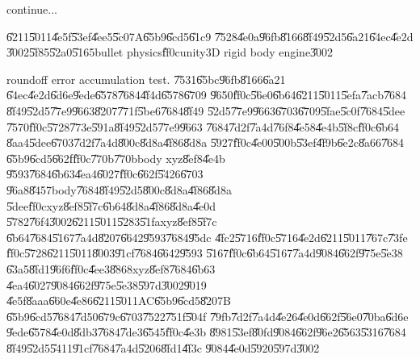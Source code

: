 continue...

\clearpage%

\begin{case}
\U{6211}\U{5011}\U{4e5f}\U{53ef}\U{4ee5}\U{5c07}A\U{65b9}\U{6cd5}\U{61c9}%
\U{7528}\U{4e0a}\U{96fb}\U{8166}\U{8f49}\U{52d5}\U{6a21}\U{64ec}\U{4e2d}%
\U{3002}\U{5f85}\U{52a0}\U{5165}bullet physics\U{ff0c}unity3D rigid body
engine\U{3002}
\end{case}

\clearpage%

\begin{case}
roundoff error accumulation test. \U{7531}\U{65bc}\U{96fb}\U{8166}\U{6a21}%
\U{64ec}\U{4e2d}\U{6d6e}\U{9ede}\U{6578}\U{7684}\U{4f4d}\U{6578}\U{6709}%
\U{9650}\U{ff0c}\U{56e0}\U{6b64}\U{6211}\U{5011}\U{5efa}\U{7acb}\U{7684}%
\U{8f49}\U{52d5}\U{77e9}\U{9663}\U{8207}\U{771f}\U{5be6}\U{7684}\U{8f49}%
\U{52d5}\U{77e9}\U{9663}\U{6703}\U{6709}\U{5fae}\U{5c0f}\U{7684}\U{5dee}%
\U{7570}\U{ff0c}\U{5728}\U{773e}\U{591a}\U{8f49}\U{52d5}\U{77e9}\U{9663}%
\U{7684}\U{7d2f}\U{7a4d}\U{76f8}\U{4e58}\U{4e4b}\U{5f8c}\U{ff0c}\U{6b64}%
\U{8aa4}\U{5dee}\U{6703}\U{7d2f}\U{7a4d}\U{800c}\U{8d8a}\U{4f86}\U{8d8a}%
\U{5927}\U{ff0c}\U{4e00}\U{500b}\U{53ef}\U{4f9b}\U{6e2c}\U{8a66}\U{7684}%
\U{65b9}\U{6cd5}\U{662f}\U{ff0c}\U{770b}\U{770b}body xyz\U{8ef8}\U{4e4b}%
\U{9593}\U{7684}\U{6b63}\U{4ea4}\U{6027}\U{ff0c}\U{662f}\U{5426}\U{6703}%
\U{96a8}\U{8457}body\U{7684}\U{8f49}\U{52d5}\U{800c}\U{8d8a}\U{4f86}\U{8d8a}%
\U{5dee}\U{ff0c}xyz\U{8ef8}\U{5f7c}\U{6b64}\U{8d8a}\U{4f86}\U{8d8a}\U{4e0d}%
\U{5782}\U{76f4}\U{3002}\U{6211}\U{5011}\U{5283}\U{51fa}xyz\U{8ef8}\U{5f7c}%
\U{6b64}\U{7684}\U{5167}\U{7a4d}\U{8207}\U{6642}\U{9593}\U{7684}\U{95dc}%
\U{4fc2}\U{5716}\U{ff0c}\U{5716}\U{4e2d}\U{6211}\U{5011}\U{767c}\U{73fe}%
\U{ff0c}\U{5728}\U{6211}\U{5011}\U{8003}\U{91cf}\U{7684}\U{6642}\U{9593}%
\U{5167}\U{ff0c}\U{6b64}\U{5167}\U{7a4d}\U{9084}\U{662f}\U{975e}\U{5e38}%
\U{63a5}\U{8fd1}\U{96f6}\U{ff0c}\U{4ee3}\U{8868}xyz\U{8ef8}\U{7684}\U{6b63}%
\U{4ea4}\U{6027}\U{9084}\U{662f}\U{975e}\U{5e38}\U{597d}\U{3002}\U{9019}%
\U{4e5f}\U{8aaa}\U{660e}\U{4e86}\U{6211}\U{5011}AC\U{65b9}\U{6cd5}\U{8207}B%
\U{65b9}\U{6cd5}\U{7684}\U{7d50}\U{679c}\U{6703}\U{7522}\U{751f}\U{504f}%
\U{79fb}\U{7d2f}\U{7a4d}\U{4e26}\U{4e0d}\U{662f}\U{56e0}\U{70ba}\U{6d6e}%
\U{9ede}\U{6578}\U{4e0d}\U{8db3}\U{7684}\U{7de3}\U{6545}\U{ff0c}\U{4e3b}%
\U{8981}\U{53ef}\U{80fd}\U{9084}\U{662f}\U{96e2}\U{6563}\U{5316}\U{7684}%
\U{8f49}\U{52d5}\U{5411}\U{91cf}\U{7684}\U{7a4d}\U{5206}\U{8fd1}\U{4f3c}%
\U{9084}\U{4e0d}\U{5920}\U{597d}\U{3002}
\end{case}

